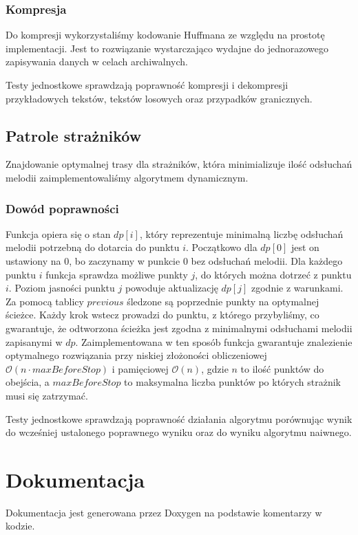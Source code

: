 \documentclass{article}
\begin{document}
\subsubsection{Kompresja}
Do kompresji wykorzystaliśmy kodowanie Huffmana ze względu na prostotę implementacji.
Jest to rozwiązanie wystarczająco wydajne
do jednorazowego zapisywania danych w celach archiwalnych.

\noindent Testy jednostkowe sprawdzają poprawność kompresji i dekompresji
przykładowych tekstów, tekstów losowych oraz przypadków granicznych.

\subsection{Patrole strażników}
Znajdowanie optymalnej trasy dla strażników, która minimializuje ilość odsłuchań melodii
zaimplementowaliśmy algorytmem dynamicznym.
\subsubsection{Dowód poprawności}
Funkcja opiera się o stan \(dp[i]\), który reprezentuje minimalną liczbę odsłuchań
melodii potrzebną do dotarcia do punktu \(i\). Początkowo dla \(dp[0]\) jest on ustawiony na 0,
bo zaczynamy w punkcie 0 bez odsłuchań melodii.
Dla każdego punktu \(i\) funkcja sprawdza możliwe punkty \(j\), do których można dotrzeć z punktu \(i\).
Poziom jasności punktu \(j\) powoduje aktualizację \(dp[j]\) zgodnie z warunkami. Za pomocą tablicy \(previous\)
śledzone są poprzednie punkty na optymalnej ścieżce. Każdy krok wstecz prowadzi do punktu, z którego
przybyliśmy, co gwarantuje, że odtworzona ścieżka jest zgodna z minimalnymi odsłuchami melodii
zapisanymi w \(dp\). Zaimplementowana w ten sposób funkcja gwarantuje znalezienie optymalnego rozwiązania
przy niskiej złożoności obliczeniowej \(\mathcal{O}(n \cdot maxBeforeStop)\) i pamięciowej \(\mathcal{O}(n)\),
gdzie \(n\) to ilość punktów do obejścia, a \(maxBeforeStop\) to
maksymalna liczba punktów po których strażnik musi się zatrzymać.

\noindent Testy jednostkowe sprawdzają poprawność działania algorytmu porównując wynik
do wcześniej ustalonego poprawnego wyniku oraz do wyniku algorytmu naiwnego.
\section{Dokumentacja}
Dokumentacja jest generowana przez Doxygen na podstawie komentarzy w kodzie.

\printbibliography[heading=bibnumbered]
\end{document}

